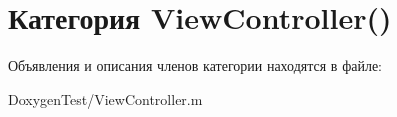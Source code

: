 \section{Категория View\+Controller()}
\label{category_view_controller_07_08}


Объявления и описания членов категории находятся в файле\+:\begin{DoxyCompactItemize}
\item 
Doxygen\+Test/View\+Controller.\+m\end{DoxyCompactItemize}
